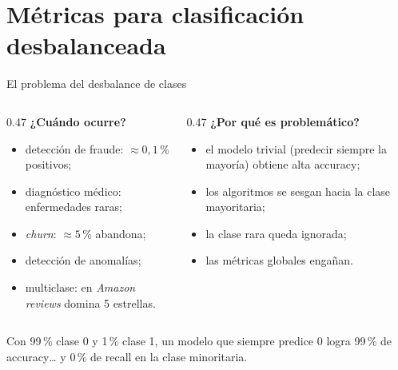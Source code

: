 \documentclass[aspectratio=169,12pt]{beamer}
\newcommand{\colhead}[1]{\textbf{#1}\par\vspace{2pt}}
\begin{document}
\section{Métricas para clasificación desbalanceada}

\begin{frame}{El problema del desbalance de clases}
  \begin{columns}[T]
    \begin{column}{0.47\textwidth}
      \colhead{¿Cuándo ocurre?}
      \small
      \begin{itemize}
        \item detección de fraude: $\approx 0{,}1$\,\% positivos;
        \item diagnóstico médico: enfermedades raras;
        \item \emph{churn}: $\approx 5$\,\% abandona;
        \item detección de anomalías;
        \item multiclase: en \emph{Amazon reviews} domina 5 estrellas.
      \end{itemize}
    \end{column}
    \begin{column}{0.47\textwidth}
      \colhead{¿Por qué es problemático?}
      \small
      \begin{itemize}
        \item el modelo trivial (predecir siempre la mayoría) obtiene alta accuracy;
        \item los algoritmos se sesgan hacia la clase mayoritaria;
        \item la clase rara queda ignorada;
        \item las métricas globales engañan.
      \end{itemize}
    \end{column}
  \end{columns}
  \vspace{4pt}
  \begin{examplebox}[99\,\% / 1\,\%]
    Con 99\,\% clase 0 y 1\,\% clase 1, un modelo que siempre predice 0 logra 99\,\% de accuracy\ldots{} y 0\,\% de recall en la clase minoritaria.
  \end{examplebox}
\end{frame}
\end{document}
